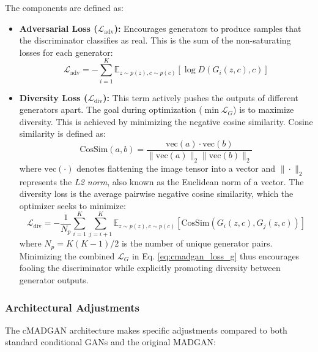 The components are defined as:
\begin{itemize}
    \item \textbf{Adversarial Loss ($\mathcal{L}_{\text{adv}}$):} Encourages generators to produce samples that the discriminator classifies as real. This is the sum of the non-saturating losses for each generator:
    \begin{equation}
    \label{eq:cmadgan_loss_g_adv}
    \mathcal{L}_{\text{adv}} = - \sum_{i=1}^{K} \mathbb{E}_{z \sim p(z), c \sim p(c)} [\log D(G_i(z, c), c)]
    \end{equation}

    \item \textbf{Diversity Loss ($\mathcal{L}_{\text{div}}$):} This term actively pushes the outputs of different generators apart. The goal during optimization ($\min \mathcal{L}_G$) is to maximize diversity. This is achieved by minimizing the negative cosine similarity. Cosine similarity is defined as:
    \begin{equation}
    \label{eq:cmadgan_cossim}
    \text{CosSim}(a, b) = \frac{\text{vec}(a) \cdot \text{vec}(b)}{\|\text{vec}(a)\|_2 \|\text{vec}(b)\|_2}
    \end{equation}
    where $\text{vec}(\cdot)$ denotes flattening the image tensor into a vector and $\|\cdot\|_2$ represents the \textit{L2 norm}, also known as the Euclidean norm of a vector. The diversity loss is the average pairwise negative cosine similarity, which the optimizer seeks to minimize:
    \begin{equation}
    \label{eq:cmadgan_loss_g_div}
    \mathcal{L}_{\text{div}} = -\frac{1}{N_p} \sum_{i=1}^{K} \sum_{j=i+1}^{K} \mathbb{E}_{z \sim p(z), c \sim p(c)} [\text{CosSim}(G_i(z, c), G_j(z, c))]
    \end{equation}
    where $N_p = K(K-1)/2$ is the number of unique generator pairs. Minimizing the combined $\mathcal{L}_G$ in Eq. \ref{eq:cmadgan_loss_g} thus encourages fooling the discriminator while explicitly promoting diversity between generator outputs.
\end{itemize}

\subsubsection{Architectural Adjustments}
\label{theory_cmadgan_architecture}

The cMADGAN architecture makes specific adjustments compared to both standard conditional GANs and the original MADGAN:

